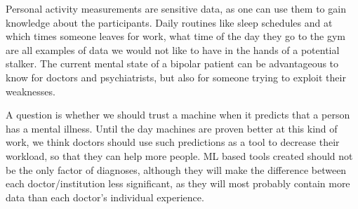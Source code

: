 Personal activity measurements are sensitive data, as one can use them to gain knowledge about the participants. Daily routines like sleep schedules and at which times someone leaves for work, what time of the day they go to the gym are all examples of data we would not like to have in the hands of a potential stalker. The current mental state of a bipolar patient can be advantageous to know for doctors and psychiatrists, but also for someone trying to exploit their weaknesses. 

A question is whether we should trust a machine when it predicts that a person has a mental illness. Until the day machines are proven better at this kind of work, we think doctors should use such predictions as a tool to decrease their workload, so that they can help more people. ML based tools created should not be the only factor of diagnoses, although they will make the difference between each doctor/institution less significant, as they will most probably contain more data than each doctor's individual experience. 




 






 


